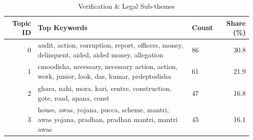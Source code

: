 \begin{table}[htbp]
\centering
\caption{Verification \& Legal Sub-themes}
\label{tab:topics_Verification_Legal}
\begin{tabular}{rlp{7cm}r}
\toprule
Topic ID & Top Keywords & Count & Share (\%) \\
\midrule
0 & audit, action, corruption, report, officers, money, delinquent, aided, aided money, allegation & 86 & 30.8 \\
1 & cmoodisha, necessary, necessary action, action, work, junior, look, das, kumar, prdeptodisha & 61 & 21.9 \\
2 & ghara, nahi, mora, kari, centre, construction, gote, road, apana, const & 47 & 16.8 \\
3 & house, awas, yojana, pucca, scheme, mantri, awas yojana, pradhan, pradhan mantri, mantri awas & 45 & 16.1 \\
\bottomrule
\end{tabular}
\end{table}